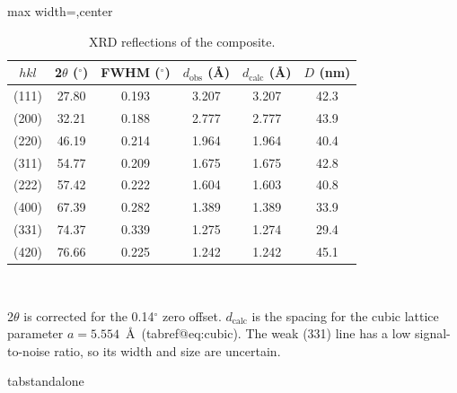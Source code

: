 \documentclass[11pt]{article}
\makeatletter
\newcommand{\Cref}[1]{\csname tabref@#1\endcsname}
\makeatother
\begin{document}
\setcounter{table}{2}
\fi\fi
\begin{table}[!htbp]
\centering
\caption{XRD reflections of the composite.}
\label{tab:xrd}
\scriptsize
\setlength{\tabcolsep}{3.5pt}
\begin{adjustbox}{max width=\textwidth,center}
\begin{tabular}{cccccc}
\toprule
\textbf{$hkl$} & \textbf{2$\theta$ ($^{\circ}$)} & \textbf{FWHM ($^{\circ}$)} & \textbf{$d_{\mathrm{obs}}$ (\AA)} & \textbf{$d_{\mathrm{calc}}$ (\AA)} & \textbf{$D$ (nm)} \\
\midrule
(111) & 27.80 & 0.193 & 3.207 & 3.207 & 42.3 \\
(200) & 32.21 & 0.188 & 2.777 & 2.777 & 43.9 \\
(220) & 46.19 & 0.214 & 1.964 & 1.964 & 40.4 \\
(311) & 54.77 & 0.209 & 1.675 & 1.675 & 42.8 \\
(222) & 57.42 & 0.222 & 1.604 & 1.603 & 40.8 \\
(400) & 67.39 & 0.282 & 1.389 & 1.389 & 33.9 \\
(331) & 74.37 & 0.339 & 1.275 & 1.274 & 29.4 \\
(420) & 76.66 & 0.225 & 1.242 & 1.242 & 45.1 \\
\bottomrule
\end{tabular}
\end{adjustbox}
\\[3pt]
\begin{minipage}{0.96\linewidth}
\raggedright\scriptsize 2$\theta$ is corrected for the 0.14$^{\circ}$ zero offset. $d_{\mathrm{calc}}$ is the spacing for the cubic lattice parameter $a = 5.554$~\AA\ (\Cref{eq:cubic}). The weak (331) line has a low signal-to-noise ratio, so its width and size are uncertain.
\end{minipage}
\end{table}
\expandafter\ifx\csname tabstandalone\endcsname\relax\else
\end{document}
